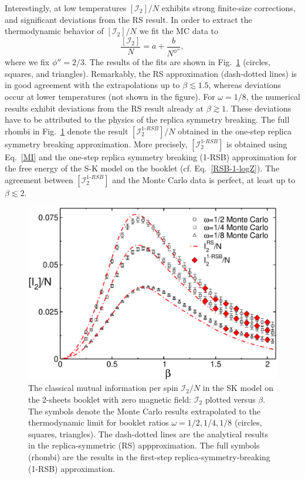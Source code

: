 \documentclass[twocolumn,superscriptaddress,prb,10pt]{revtex4-1}
\begin{document}
Interestingly, at low temperatures $[{\mathcal I}_2]/N$ exhibits strong finite-size corrections, 
and significant deviations from the RS result. In order to extract the thermodynamic behavior of 
$[{\mathcal I}_2]/N$ we fit the MC data to 
%
\begin{equation}
\frac{[{\mathcal I}_2]}{N}=a+\frac{b}{N^{\phi''}},
\end{equation}
%
where we fix $\phi''=2/3$. The results of the fits are shown in Fig.~\ref{I2-extrapolated} 
(circles, squares, and triangles). Remarkably, the RS approximation (dash-dotted lines) is 
in good agreement with the extrapolations up to $\beta\lesssim 1.5$, whereas deviations 
occur at lower temperatures (not shown in the figure). 
For $\omega=1/8$, the numerical results exhibit deviations from the RS result already at $\beta\gtrsim 1$. 
These deviations have to be attributed to the physics of the replica symmetry breaking. 
The full rhombi in Fig.~\ref{I2-extrapolated} denote the result $[{\mathcal I}^{1\textrm{-}RSB}_2]/N$ 
obtained in the one-step replica symmetry breaking approximation. More precisely, 
$[{\mathcal I}_2^{1\textrm{-}RSB}]$ is obtained using Eq.~\eqref{MI} and the one-step replica 
symmetry breaking (1-RSB) approximation for the free energy of the S-K model on the 
booklet (cf. Eq.~\eqref{RSB-1-logZ}). The agreement between $[{\mathcal I}_2^{1\textrm{-}RSB}]$ 
and the Monte Carlo data is perfect, at least up to $\beta\lesssim 2$. 
 

\begin{figure}[t]
\includegraphics*[width=0.93\linewidth]{./draft_figs/I2_extrapolated}
\caption{ The classical mutual information per spin ${\mathcal I}_2/N$ 
 in the SK model on the $2$-sheets booklet with zero magnetic field: 
 ${\mathcal I}_2$ plotted versus $\beta$. The symbols denote the 
 Monte Carlo results extrapolated to the thermodynamic limit for 
 booklet ratios $\omega=1/2,1/4,1/8$ (circles, squares, triangles). 
 The dash-dotted lines are the analytical results in the 
 replica-symmetric (RS) appproximation. The full symbols (rhombi) 
 are the results in the first-step replica-symmetry-breaking (1-RSB) 
 approximation.
}
\label{I2-extrapolated}
\end{figure}
\end{document}
